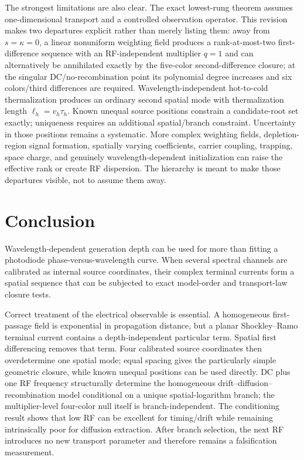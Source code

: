 \documentclass[11pt]{article}
\begin{document}
The strongest limitations are also clear. The exact lowest-rung theorem assumes one-dimensional transport and a controlled observation operator. This revision makes two departures explicit rather than merely listing them: away from $s=\kappa=0$, a linear nonuniform weighting field produces a rank-at-most-two first-difference sequence with an RF-independent multiplier $q=1$ and can alternatively be annihilated exactly by the five-color second-difference closure; at the singular DC/no-recombination point its polynomial degree increases and six colors/third differences are required. Wavelength-independent hot-to-cold thermalization produces an ordinary second spatial mode with thermalization length $\ell_h=v_h\tau_h$. Known unequal source positions constrain a candidate-root set exactly; uniqueness requires an additional spatial/branch constraint. Uncertainty in those positions remains a systematic. More complex weighting fields, depletion-region signal formation, spatially varying coefficients, carrier coupling, trapping, space charge, and genuinely wavelength-dependent initialization can raise the effective rank or create RF dispersion. The hierarchy is meant to make those departures visible, not to assume them away.

\section{Conclusion}

Wavelength-dependent generation depth can be used for more than fitting a photodiode phase-versus-wavelength curve. When several spectral channels are calibrated as internal source coordinates, their complex terminal currents form a spatial sequence that can be subjected to exact model-order and transport-law closure tests.

Correct treatment of the electrical observable is essential. A homogeneous first-passage field is exponential in propagation distance, but a planar Shockley--Ramo terminal current contains a depth-independent particular term. Spatial first differencing removes that term. Four calibrated source coordinates then overdetermine one spatial mode; equal spacing gives the particularly simple geometric closure, while known unequal positions can be used directly. DC plus one RF frequency structurally determine the homogeneous drift--diffusion--recombination model conditional on a unique spatial-logarithm branch; the multiplier-level four-color null itself is branch-independent. The conditioning result shows that low RF can be excellent for timing/drift while remaining intrinsically poor for diffusion extraction. After branch selection, the next RF introduces no new transport parameter and therefore remains a falsification measurement.
\end{document}
